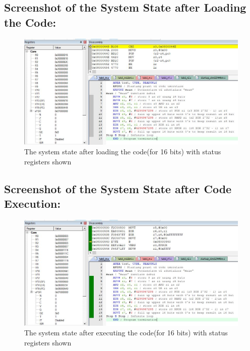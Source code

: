 \documentclass[12pt]{article}
\begin{document}
\subsection{Screenshot of the System State after Loading the Code:}
\begin{figure}[ht]
    \centering
    \includegraphics[scale=.7]{images/lab3_1_ss1.jpg}
    \caption{The system state after loading the code(for 16 bits) with status registers shown}
    \label{fig:before_task_three_one}
\end{figure}
\pagebreak
\subsection{Screenshot of the System State after Code Execution:}
\begin{figure}[ht]
    \centering
    \includegraphics[scale=.7]{images/lab3_1_ss2.jpg}
    \caption{The system state after executing the code(for 16 bits) with status registers shown}
    \label{fig:after_task_three_one}
\end{figure}
\pagebreak
\end{document}

